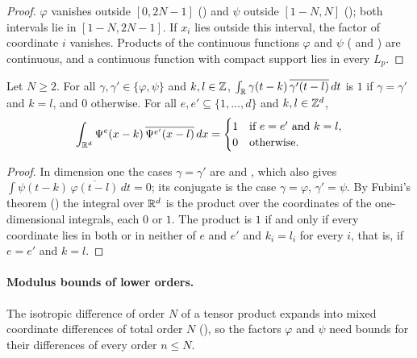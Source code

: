 \begin{proof}
\leanok
{}
$\varphi$ vanishes outside $[0, 2N - 1]$ () and $\psi$ outside
$[1 - N, N]$ (); both intervals lie in $[1 - N, 2N - 1]$. If $x_i$
lies outside this interval, the factor of coordinate $i$ vanishes. Products of the continuous
functions $\varphi$ and $\psi$ ( and
) are continuous, and a continuous function with compact support
lies in every $L_p$.
\end{proof}

\begin{proposition}
\label{prop:daub-rd-orthonormal}
\leanok
{}
Let $N \geq 2$. For all $\gamma, \gamma' \in \{\varphi, \psi\}$ and $k, l \in \mathbb{Z}$,
$\int_{\mathbb{R}} \gamma(t - k) \, \overline{\gamma'(t - l)} \, dt$ is $1$ if $\gamma = \gamma'$ and
$k = l$, and $0$ otherwise. For all $e, e' \subseteq \{1, \dots, d\}$ and $k, l \in \mathbb{Z}^d$,
\[
  \int_{\mathbb{R}^d} \Psi^e(x - k) \, \overline{\Psi^{e'}(x - l)} \, dx =
  \begin{cases} 1 & \text{if } e = e' \text{ and } k = l , \\
    0 & \text{otherwise.} \end{cases}
\]
\end{proposition}

\begin{proof}
\leanok
{}
In dimension one the cases $\gamma = \gamma'$ are  and
, which also gives
$\int \psi(t - k) \, \overline{\varphi(t - l)} \, dt = 0$; its conjugate is the case
$\gamma = \varphi$, $\gamma' = \psi$. By Fubini's theorem () the
integral over $\mathbb{R}^d$ is the product over the coordinates of the one-dimensional integrals, each
$0$ or $1$. The product is $1$ if and only if every coordinate lies in both or in neither of
$e$ and $e'$ and $k_i = l_i$ for every $i$, that is, if $e = e'$ and $k = l$.
\end{proof}

\paragraph{Modulus bounds of lower orders.}
The isotropic difference of order $N$ of a tensor product expands into mixed coordinate
differences of total order $N$ (), so the factors $\varphi$ and $\psi$
need bounds for their differences of every order $n \leq N$.

